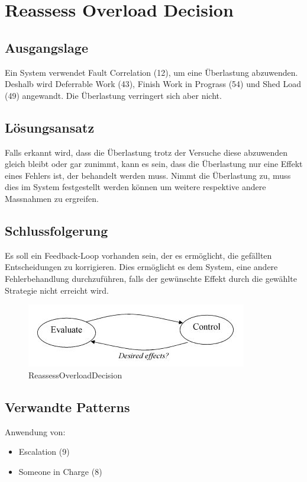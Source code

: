 \section{Reassess Overload Decision}

\subsection{Ausgangslage}

Ein System verwendet Fault Correlation (12), um eine Überlastung abzuwenden. Deshalb wird Deferrable Work (43), Finish Work in Prograss (54) und Shed Load (49) angewandt. Die Überlastung verringert sich aber nicht.

\subsection{Lösungsansatz}

Falls erkannt wird, dass die Überlastung trotz der Versuche diese abzuwenden gleich bleibt oder gar zunimmt, kann es sein, dass die Überlastung nur eine Effekt eines Fehlers ist, der behandelt werden muss. Nimmt die Überlastung zu, muss dies im System festgestellt werden können um weitere respektive andere Massnahmen zu ergreifen.

\subsection{Schlussfolgerung}

Es soll ein Feedback-Loop vorhanden sein, der es ermöglicht, die gefällten Entscheidungen zu korrigieren. Dies ermöglicht es dem System, eine andere Fehlerbehandlung durchzuführen, falls der gewünschte Effekt durch die gewählte Strategie nicht erreicht wird.

\begin{figure}[H]
	\centering
	\includegraphics[width=\textwidth]{content/faulttolerance/images/ReassessOverloadDecision.JPG}
	\caption{ReassessOverloadDecision}
\end{figure}


\subsection{Verwandte Patterns}

Anwendung von:
\begin{itemize}
	\item Escalation (9)
\end{itemize}

\begin{itemize}
	\item Someone in Charge (8)
\end{itemize}



